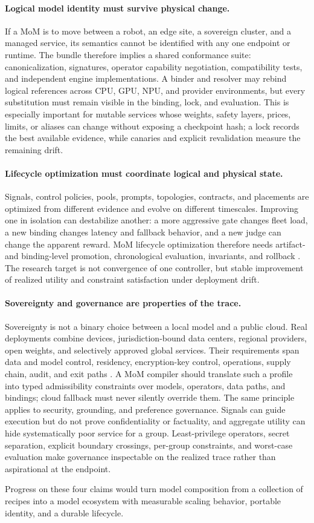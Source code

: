 \paragraph{Logical model identity must survive physical change.}
If a MoM is to move between a robot, an edge site, a sovereign cluster, and a
managed service, its semantics cannot be identified with any one endpoint or
runtime. The bundle therefore implies a shared conformance suite:
canonicalization, signatures, operator capability negotiation, compatibility
tests, and independent engine implementations. A binder and resolver may
rebind logical references across CPU, GPU, NPU, and provider environments, but
every substitution must remain visible in the binding, lock, and evaluation. This is
especially important for mutable services whose weights, safety layers, prices,
limits, or aliases can change without exposing a checkpoint hash; a lock
records the best available evidence, while canaries and explicit revalidation
measure the remaining drift.

\paragraph{Lifecycle optimization must coordinate logical and physical state.}
Signals, control policies, pools, prompts, topologies, contracts, and placements
are optimized from different evidence and evolve on different timescales. Improving one in
isolation can destabilize another: a more aggressive gate changes fleet load,
a new binding changes latency and fallback behavior, and a new judge can change
the apparent reward. MoM lifecycle optimization therefore needs artifact- and
binding-level promotion, chronological evaluation, invariants, and rollback
\citep{chen_2026_wrp}. The research target is not convergence of one controller,
but stable improvement of realized utility and constraint satisfaction under
deployment drift.

\paragraph{Sovereignty and governance are properties of the trace.}
Sovereignty is not a binary choice between a local model and a public cloud.
Real deployments combine devices, jurisdiction-bound data centers, regional
providers, open weights, and selectively approved global services. Their
requirements span data and model control, residency, encryption-key control,
operations, supply chain, audit, and exit paths
\citep{european_commission_2026_sovereignty}. A MoM compiler should translate
such a profile into typed admissibility constraints over models, operators,
data paths, and bindings; cloud fallback must never silently override them.
The same principle applies to security, grounding, and preference governance.
Signals can guide execution but do not prove confidentiality or factuality,
and aggregate utility can hide systematically poor service for a group.
Least-privilege operators, secret separation, explicit boundary crossings,
per-group constraints, and worst-case evaluation make governance inspectable
on the realized trace rather than aspirational at the endpoint.

Progress on these four claims would turn model composition from a collection of
recipes into a model ecosystem with measurable scaling behavior, portable
identity, and a durable lifecycle.
